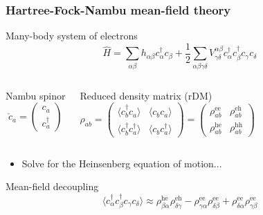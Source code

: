 \documentclass{beamer}
\begin{document}
\begin{frame}
\frametitle{Hartree-Fock-Nambu mean-field theory}

\begin{exampleblock}{Many-body system of electrons}
\begin{equation*}
\hat{H}=\sum_{\alpha\beta}h_{\alpha\beta}c_{\alpha}^{\dagger}c_{\beta}+\frac{1}{2}\sum_{\alpha\beta\gamma\delta}V_{\gamma\delta}^{\alpha\beta}c_{\alpha}^{\dagger}c_{\beta}^{\dagger}c_{\gamma}c_{\delta}
\end{equation*}
\end{exampleblock}
\pause

\begin{columns}
\column{2.5cm}
\begin{alertblock}{Nambu spinor}
\vspace*{-4.5mm}
\begin{equation*}
\check{c}_{a}=\left(\begin{array}{c}
c_{a}\\
c_{a}^{\dagger}
\end{array}\right)
\end{equation*}
\end{alertblock}
\pause

\column{7.5cm}
\begin{exampleblock}{Reduced density matrix (rDM)}
\vspace*{-4.5mm}
\begin{equation*}
\rho_{ab}=\left(\begin{array}{cc}
\langle c_{b}^{\dagger}c_{a}\rangle & \langle c_{b}c_{a}\rangle\\
\langle c_{b}^{\dagger}c_{a}^{\dagger}\rangle & \langle c_{b}c_{a}^{\dagger}\rangle
\end{array}\right)=\left(\begin{array}{cc}
\rho_{ab}^{\text{ee}} & \rho_{ab}^{\text{eh}}\\
\rho_{ab}^{\text{he}} & \rho_{ab}^{\text{hh}}
\end{array}\right)
\end{equation*}
\end{exampleblock}
\pause
\end{columns}

\vspace*{4,5mm}
\begin{itemize} 
\item Solve for the Heinsenberg equation of motion...
\end{itemize}
\pause

\begin{alertblock}{Mean-field decoupling}
\begin{equation*}
\langle c_{\alpha}^{\dagger}c_{\beta}^{\dagger}c_{\gamma}c_{\delta}\rangle\approx\mathfrak{\rho}_{\beta\alpha}^{\text{he}}\mathfrak{\rho}_{\delta\gamma}^{\text{eh}}-\rho_{\gamma\alpha}^{\text{ee}}\rho_{\delta\beta}^{\text{ee}}+\rho_{\delta\alpha}^{\text{ee}}\rho_{\gamma\beta}^{\text{ee}}
\end{equation*}
\end{alertblock}

\end{frame}
\end{document}
